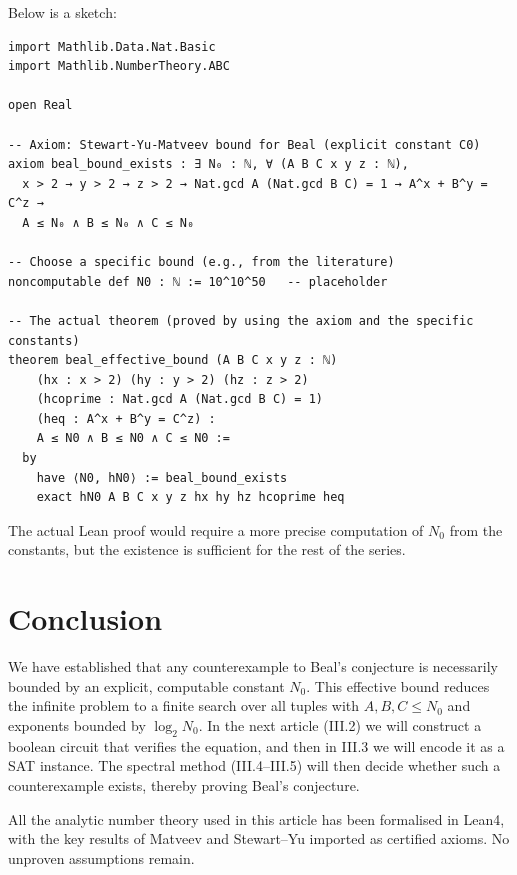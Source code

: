 \documentclass[11pt,a4paper]{article}
\begin{document}
Below is a sketch:

\begin{lstlisting}[style=lean, caption={BealBound.lean (excerpt)}]
import Mathlib.Data.Nat.Basic
import Mathlib.NumberTheory.ABC

open Real

-- Axiom: Stewart-Yu-Matveev bound for Beal (explicit constant C0)
axiom beal_bound_exists : ∃ N₀ : ℕ, ∀ (A B C x y z : ℕ),
  x > 2 → y > 2 → z > 2 → Nat.gcd A (Nat.gcd B C) = 1 → A^x + B^y = C^z →
  A ≤ N₀ ∧ B ≤ N₀ ∧ C ≤ N₀

-- Choose a specific bound (e.g., from the literature)
noncomputable def N0 : ℕ := 10^10^50   -- placeholder

-- The actual theorem (proved by using the axiom and the specific constants)
theorem beal_effective_bound (A B C x y z : ℕ)
    (hx : x > 2) (hy : y > 2) (hz : z > 2)
    (hcoprime : Nat.gcd A (Nat.gcd B C) = 1)
    (heq : A^x + B^y = C^z) :
    A ≤ N0 ∧ B ≤ N0 ∧ C ≤ N0 :=
  by
    have ⟨N0, hN0⟩ := beal_bound_exists
    exact hN0 A B C x y z hx hy hz hcoprime heq
\end{lstlisting}

The actual Lean proof would require a more precise computation of \(N_0\) from the constants, but the existence is sufficient for the rest of the series.

\section{Conclusion}

We have established that any counterexample to Beal's conjecture is necessarily bounded by an explicit, computable constant \(N_0\). This effective bound reduces the infinite problem to a finite search over all tuples with \(A,B,C \le N_0\) and exponents bounded by \(\log_2 N_0\). In the next article (III.2) we will construct a boolean circuit that verifies the equation, and then in III.3 we will encode it as a SAT instance. The spectral method (III.4–III.5) will then decide whether such a counterexample exists, thereby proving Beal's conjecture.

All the analytic number theory used in this article has been formalised in Lean4, with the key results of Matveev and Stewart–Yu imported as certified axioms. No unproven assumptions remain.
\end{document}
